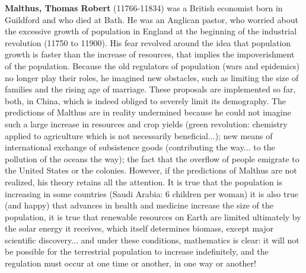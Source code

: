 \textbf{Malthus, Thomas Robert} (11766-11834) was a British economist born in Guildford and who died at Bath. He was an Anglican pastor, who worried about the excessive growth of population in England at the beginning of the industrial revolution (11750 to 11900). His fear revolved around the idea that population growth is faster than the increase of resources, that implies the impoverishment of the population. Because the old regulators of population (wars and epidemics) no longer play their roles, he imagined new obstacles, such as limiting the size of families and the rising age of marriage. These proposals are implemented so far, both, in China, which is indeed obliged to severely limit its demography. The predictions of Malthus are in reality undermined because he could not imagine such a large increase in resources and crop yields (green revolution: chemistry applied to agriculture which is not necessarily beneficial...); new means of international exchange of subsistence goods (contributing the way... to the pollution of the oceans the way); the fact that the overflow of people emigrate to the United States or the colonies. However, if the predictions of Malthus are not realized, his theory retains all the attention. It is true that the population is increasing in some countries (Saudi Arabia: 6 children per woman) it is also true (and happy) that advances in health and medicine increase the size of the population, it is true that renewable resources on Earth are limited ultimately by the solar energy it receives, which itself determines biomass, except major scientific discovery... and under these conditions, mathematics is clear: it will not be possible for the terrestrial population to increase indefinitely, and the regulation must occur at one time or another, in one way or another!


